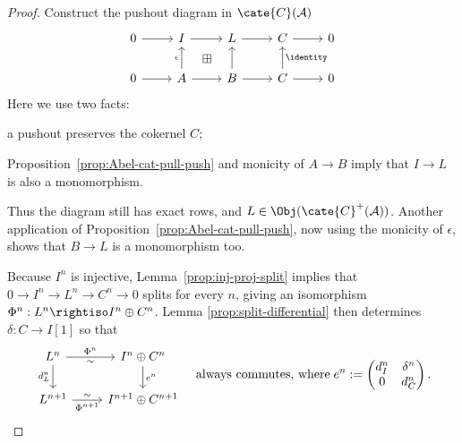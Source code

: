 \begin{proof}
	Construct the pushout diagram in $\cate{C}(\mathcal{A})$
	\[\begin{tikzcd}
		0 \arrow[r] & I \arrow[r] & L \arrow[r] \arrow[phantom, ld, "\boxplus" description] & C \arrow[r] & 0 \\
		0 \arrow[r] & A \arrow[r] \arrow[u, "\epsilon"] & B \arrow[r] \arrow[u] & C \arrow[r] \arrow[u, "\identity"'] & 0
	\end{tikzcd}\]
	Here we use two facts:
	\begin{compactitem}
		\item a pushout preserves the cokernel $C$;
		\item Proposition~\ref{prop:Abel-cat-pull-push} and monicity of
		$A\to B$ imply that $I\to L$ is also a monomorphism.
	\end{compactitem}
	Thus the diagram still has exact rows, and
	$L\in\Obj(\cate{C}^+(\mathcal{A}))$. Another application of
	Proposition~\ref{prop:Abel-cat-pull-push}, now using the monicity of
	$\epsilon$, shows that $B\to L$ is a monomorphism too.

	Because $I^n$ is injective, Lemma~\ref{prop:inj-proj-split} implies that
	$0\to I^n\to L^n\to C^n\to0$ splits for every $n$, giving an isomorphism
	$\Phi^n:L^n\rightiso I^n\oplus C^n$. Lemma
	\ref{prop:split-differential} then determines $\delta:C\to I[1]$ so that
	\begin{equation}\label{eqn:horseshoe-aux}\begin{tikzcd}
		L^n \arrow[r, "{\Phi^n}", "\sim"'] \arrow[d, "{d_L^n}"'] & I^n \oplus C^n \arrow[d, "{e^n}"] \\
		L^{n+1} \arrow[r, "{\Phi^{n+1}}"', "\sim"] & I^{n+1} \oplus C^{n+1}
		\end{tikzcd} \quad \text{always commutes, where}\;
		e^n := \begin{pmatrix} d_I^n & \delta^n \\ 0 & d_C^n \end{pmatrix}.
	\end{equation}


\end{proof}

